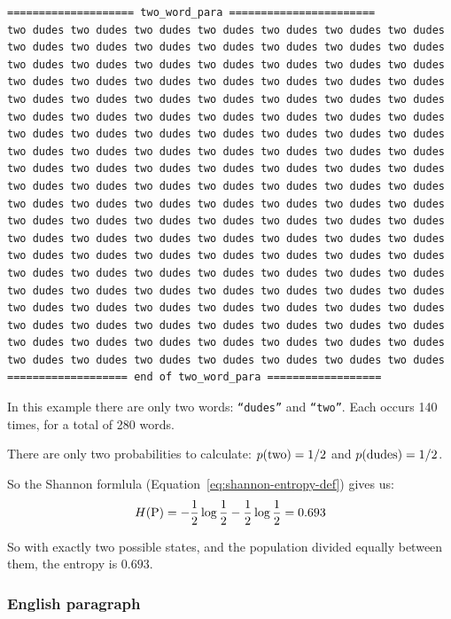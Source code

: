 \documentclass[11pt]{article}
\begin{document}
\begin{tiny}
\begin{verbatim}
==================== two_word_para =======================
two dudes two dudes two dudes two dudes two dudes two dudes two dudes
two dudes two dudes two dudes two dudes two dudes two dudes two dudes
two dudes two dudes two dudes two dudes two dudes two dudes two dudes
two dudes two dudes two dudes two dudes two dudes two dudes two dudes
two dudes two dudes two dudes two dudes two dudes two dudes two dudes
two dudes two dudes two dudes two dudes two dudes two dudes two dudes
two dudes two dudes two dudes two dudes two dudes two dudes two dudes
two dudes two dudes two dudes two dudes two dudes two dudes two dudes
two dudes two dudes two dudes two dudes two dudes two dudes two dudes
two dudes two dudes two dudes two dudes two dudes two dudes two dudes
two dudes two dudes two dudes two dudes two dudes two dudes two dudes
two dudes two dudes two dudes two dudes two dudes two dudes two dudes
two dudes two dudes two dudes two dudes two dudes two dudes two dudes
two dudes two dudes two dudes two dudes two dudes two dudes two dudes
two dudes two dudes two dudes two dudes two dudes two dudes two dudes
two dudes two dudes two dudes two dudes two dudes two dudes two dudes
two dudes two dudes two dudes two dudes two dudes two dudes two dudes
two dudes two dudes two dudes two dudes two dudes two dudes two dudes
two dudes two dudes two dudes two dudes two dudes two dudes two dudes
two dudes two dudes two dudes two dudes two dudes two dudes two dudes
=================== end of two_word_para ==================
\end{verbatim}
\end{tiny}

In this example there are only two words: \texttt{``dudes''} and
\texttt{``two''}.  Each occurs 140 times, for a total of 280 words.

There are only two probabilities to calculate: $p({\rm two}) = 1/2$
and $p({\rm dudes}) = 1/2$.

So the Shannon formlula (Equation~\ref{eq:shannon-entropy-def}) gives
us:
$$
H({\rm P}) = -\frac{1}{2}\log\frac{1}{2} - \frac{1}{2}\log\frac{1}{2}
= 0.693
$$

So with exactly two possible states, and the population divided
equally between them, the entropy is $0.693$.


\subsubsection{English paragraph}
\end{document}
